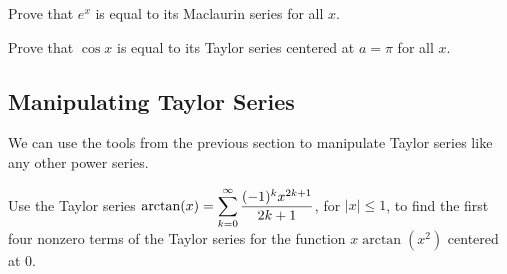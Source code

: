 \documentclass[12pt]{article}
\begin{document}
\vspace{5mm}


\Example Prove that $e^x$ is equal to its Maclaurin series for all $x$.

\newpage

\Example Prove that $\cos x$ is equal to its Taylor series centered at $a=\pi$ for all $x$.

\vfill

\subsection*{Manipulating Taylor Series}

We can use the tools from the previous section to manipulate Taylor series like any other power series.

\Example Use the Taylor series $\arctan(x)=\displaystyle\sum_{k=0}^\infty\dfrac{(-1)^k x^{2k+1}}{2k+1}$, for $|x|\leq 1$, to find the first four nonzero terms of the Taylor series for the function $x\arctan\left(x^2\right)$ centered at $0$.

\vfill
\end{document}
